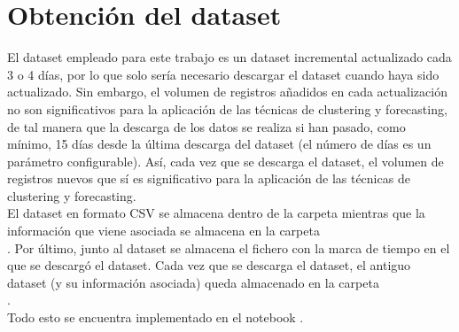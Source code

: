 
\section{Obtención del dataset}
\label{sec:data-downloading}

El dataset empleado para este trabajo es un dataset incremental actualizado cada 3 o 4 días, por lo que solo sería necesario descargar el dataset cuando haya sido actualizado. Sin embargo, el volumen de registros añadidos en cada actualización no son significativos para la aplicación de las técnicas de clustering y forecasting, de tal manera que la descarga de los datos se realiza si han pasado, como mínimo, 15 días desde la última descarga del dataset (el número de días es un parámetro configurable). Así, cada vez que se descarga el dataset, el volumen de registros nuevos que sí es significativo para la aplicación de las técnicas de clustering y forecasting. \\

El dataset en formato CSV se almacena dentro de la carpeta  mientras que la información que viene asociada \citep{dataset} se almacena en la carpeta \\ . Por último, junto al dataset se almacena el fichero  con la marca de tiempo en el que se descargó el dataset. Cada vez que se descarga el dataset, el antiguo dataset (y su información asociada) queda almacenado en la carpeta \\ . \\

Todo esto se encuentra implementado en el notebook  \citep{master}.
